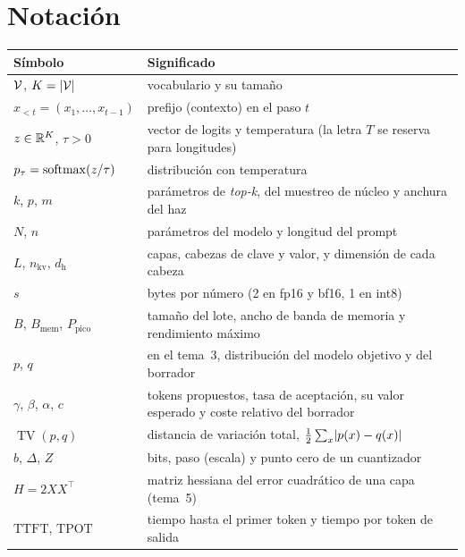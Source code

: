 \documentclass[11pt,a4paper,twoside,openany]{book}
\newcommand{\T}{^{\top}}
\newcommand{\TV}{\operatorname{TV}}
\newcommand{\Bmem}{B_{\mathrm{mem}}}
\newcommand{\Ppico}{P_{\mathrm{pico}}}
\newcommand{\nkv}{n_{\mathrm{kv}}}
\newcommand{\dhd}{d_{\mathrm{h}}}
\newcommand{\TTFT}{\mathrm{TTFT}}
\newcommand{\TPOT}{\mathrm{TPOT}}
\begin{document}
\section*{Notación}
\begin{center}\small
\begin{tabularx}{\textwidth}{@{}l>{\raggedright\arraybackslash}X@{}}
\toprule
Símbolo & Significado \\
\midrule
$\mathcal{V}$, $K=\lvert\mathcal{V}\rvert$ & vocabulario y su tamaño \\
$x_{<t}=(x_1,\dots,x_{t-1})$ & prefijo (contexto) en el paso $t$ \\
$z\in\mathbb{R}^{K}$, $\tau>0$ & vector de logits y temperatura (la letra $T$ se reserva para longitudes) \\
$p_\tau=\operatorname{softmax}(z/\tau)$ & distribución con temperatura \\
$k$, $p$, $m$ & parámetros de \emph{top-k}, del muestreo de núcleo y anchura del haz \\
$N$, $n$ & parámetros del modelo y longitud del prompt \\
$L$, $\nkv$, $\dhd$ & capas, cabezas de clave y valor, y dimensión de cada cabeza \\
$s$ & bytes por número (2 en fp16 y bf16, 1 en int8) \\
$B$, $\Bmem$, $\Ppico$ & tamaño del lote, ancho de banda de memoria y rendimiento máximo \\
$p$, $q$ & en el tema~3, distribución del modelo objetivo y del borrador \\
$\gamma$, $\beta$, $\alpha$, $c$ & tokens propuestos, tasa de aceptación, su valor esperado y coste relativo del borrador \\
$\TV(p,q)$ & distancia de variación total, $\frac12\sum_x\lvert p(x)-q(x)\rvert$ \\
$b$, $\Delta$, $Z$ & bits, paso (escala) y punto cero de un cuantizador \\
$H=2XX\T$ & matriz hessiana del error cuadrático de una capa (tema~5) \\
$\TTFT$, $\TPOT$ & tiempo hasta el primer token y tiempo por token de salida \\
\bottomrule
\end{tabularx}
\end{center}

\tableofcontents

\mainmatter







\appendix


\backmatter

\end{document}

